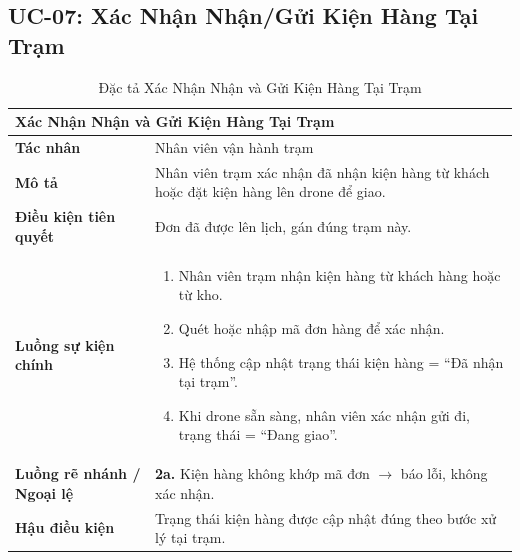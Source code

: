 \subsection{UC-07: Xác Nhận Nhận/Gửi Kiện Hàng Tại Trạm}
\begin{table}[H]
  \centering
  \begin{tabularx}{\textwidth}{|l|X|}
    \hline
    \multicolumn{2}{|l|}{\textbf{Xác Nhận Nhận và Gửi Kiện Hàng Tại Trạm}} \\
    \hline
    \textbf{Tác nhân}           & Nhân viên vận hành trạm \\ \hline
    \textbf{Mô tả}              & Nhân viên trạm xác nhận đã nhận kiện hàng từ khách hoặc đặt kiện hàng lên drone để giao. \\ \hline
    \textbf{Điều kiện tiên quyết} & Đơn đã được lên lịch, gán đúng trạm này. \\ \hline
    \textbf{Luồng sự kiện chính} &
      \begin{enumerate}[leftmargin=*, nosep, topsep=0pt]
        \item Nhân viên trạm nhận kiện hàng từ khách hàng hoặc từ kho.
        \item Quét hoặc nhập mã đơn hàng để xác nhận.
        \item Hệ thống cập nhật trạng thái kiện hàng = ``Đã nhận tại trạm''.
        \item Khi drone sẵn sàng, nhân viên xác nhận gửi đi, trạng thái = ``Đang giao''.
      \end{enumerate} \\ \hline
    \textbf{Luồng rẽ nhánh / Ngoại lệ} &
      \textbf{2a.} Kiện hàng không khớp mã đơn $\rightarrow$ báo lỗi, không xác nhận. \\ \hline
    \textbf{Hậu điều kiện}      & Trạng thái kiện hàng được cập nhật đúng theo bước xử lý tại trạm. \\
    \hline
  \end{tabularx}
  \caption{Đặc tả Xác Nhận Nhận và Gửi Kiện Hàng Tại Trạm}
  \label{tab:uc07}
\end{table}

